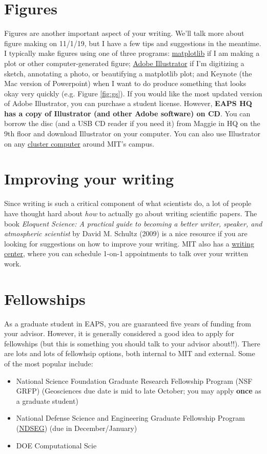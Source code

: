 \documentclass{article}
\begin{document}
\section*{Figures}
Figures are another important aspect of your writing. We'll talk more about figure making on 11/1/19, but I have a few tips and suggestions in the meantime. I typically make figures using one of three programs: \href{https://matplotlib.org}{matplotlib} if I am making a plot or other computer-generated figure; \href{https://www.adobe.com/products/illustrator.html}{Adobe Illustrator} if I'm digitizing a sketch, annotating a photo, or beautifying a matplotlib plot; and Keynote (the Mac version of Powerpoint) when I want to do produce something that looks okay very quickly (e.g. Figure \ref{fig:gs}). If you would like the most updated version of Adobe Illustrator,  you can purchase a student license. However, \textbf{EAPS HQ has a copy of Illustrator (and other Adobe software) on CD}. You can borrow the disc (and a USB CD reader if you need it) from Maggie in HQ on the 9th floor and download Illustrator on your computer. You can also use Illustrator on any \href{https://ist.mit.edu/athena-clusters}{cluster computer} around MIT's campus. 

\section*{Improving your writing}
Since writing is such a critical component of what scientists do, a lot of people have thought hard about \emph{how} to actually go about writing scientific papers. The book \emph{Eloquent Science: A practical guide to becoming a better writer, speaker, and atmospheric scientist} by David M. Schultz (2009) is a nice resource if you are looking for suggestions on how to improve your writing. MIT also has a \href{https://cmsw.mit.edu/writing-and-communication-center/}{writing center}, where you can schedule 1-on-1 appointments to talk over your written work.

\section*{Fellowships}
As a graduate student in EAPS, you are guaranteed five years of funding from your advisor. However, it is generally considered a good idea to apply for fellowships (but this is something you should talk to your advisor about!!). There are lots and lots of fellowhsip options, both internal to MIT and external. Some of the most popular include:
\begin{itemize}
    \item National Science Foundation Graduate Research Fellowship Program (NSF GRFP) (Geosciences due date is mid to late October; you may apply \textbf{once} as a graduate student)
    \item National Defense Science and Engineering Graduate Fellowship Program (\href{https://www.ndsegfellowships.org}{NDSEG}) (due in December/January)
    \item DOE Computational Scie
\end{itemize}
\end{document}
